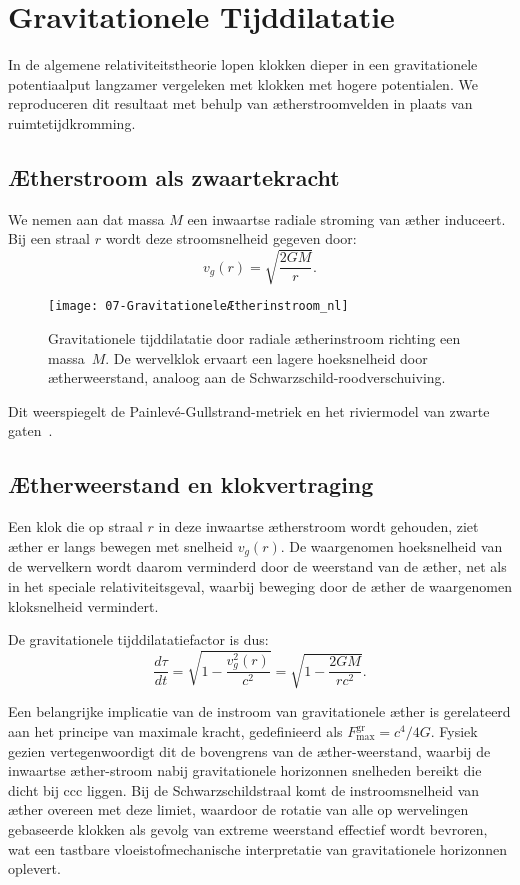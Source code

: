 \section{Gravitationele Tijddilatatie}

In de algemene relativiteitstheorie lopen klokken dieper in een gravitationele potentiaalput langzamer vergeleken met klokken met hogere potentialen. We reproduceren dit resultaat met behulp van ætherstroomvelden in plaats van ruimtetijdkromming.

\subsection*{Ætherstroom als zwaartekracht}

We nemen aan dat massa $M$ een inwaartse radiale stroming van æther induceert. Bij een straal $r$ wordt deze stroomsnelheid gegeven door:
\[
    v_g(r) = \sqrt{\frac{2GM}{r}}.
\]

\begin{figure}[htbp]
    \centering
    \texttt{[image: 07-GravitationeleÆtherinstroom\_nl]}
    \caption{Gravitationele tijddilatatie door radiale ætherinstroom richting een massa~$M$. De wervelklok ervaart een lagere hoeksnelheid door ætherweerstand, analoog aan de Schwarzschild-roodverschuiving.}
    \label{fig:GravitationeleÆtherinstroom}
\end{figure}

Dit weerspiegelt de Painlevé-Gullstrand-metriek en het riviermodel van zwarte gaten~\cite{Hamilton2004-river}.

\subsection*{Ætherweerstand en klokvertraging}

Een klok die op straal $r$ in deze inwaartse ætherstroom wordt gehouden, ziet æther er langs bewegen met snelheid $v_g(r)$. De waargenomen hoeksnelheid van de wervelkern wordt daarom verminderd door de weerstand van de æther, net als in het speciale relativiteitsgeval, waarbij beweging door de æther de waargenomen kloksnelheid vermindert.

De gravitationele tijddilatatiefactor is dus:
\[
    \frac{d\tau}{dt} = \sqrt{1 - \frac{v_g^2(r)}{c^2}} = \sqrt{1 - \frac{2GM}{rc^2}}. \tag{4}
\]

Een belangrijke implicatie van de instroom van gravitationele æther is gerelateerd aan het principe van maximale kracht, gedefinieerd als $F^{\text{gr}}_{\text{max}} = c^4 /4G$. Fysiek gezien vertegenwoordigt dit de bovengrens van de æther-weerstand, waarbij de inwaartse æther-stroom nabij gravitationele horizonnen snelheden bereikt die dicht bij ccc liggen. Bij de Schwarzschildstraal komt de instroomsnelheid van æther overeen met deze limiet, waardoor de rotatie van alle op wervelingen gebaseerde klokken als gevolg van extreme weerstand effectief wordt bevroren, wat een tastbare vloeistofmechanische interpretatie van gravitationele horizonnen oplevert.

